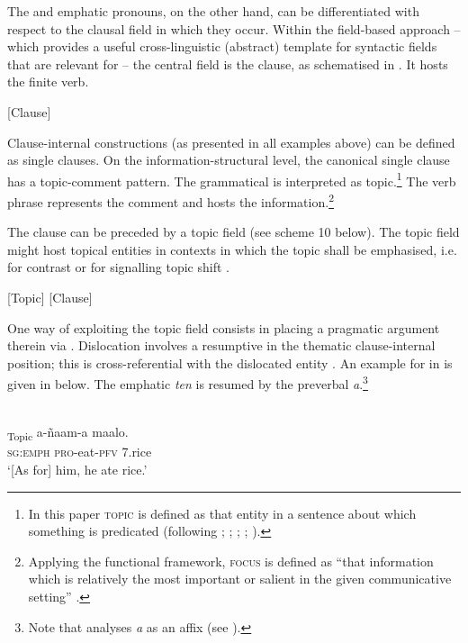 \documentclass[output=paper,newtxmath,modfonts,nonflat,hidelinks]{langsci/langscibook}
\begin{document}
The  and emphatic pronouns, on the other hand, can be differentiated with respect to the clausal field in which they occur. Within the field-based approach -- which provides a useful cross-linguistic (abstract) template for syntactic fields that are relevant for  \citep[see][]{Good2010,Güldemanninprep,Apeletal15} -- the central field is the clause, as schematised in . It hosts the finite verb.

\ea\label{ex:apel:9} [Clause]
\z

Clause-internal constructions (as presented in all examples above) can be defined as single clauses. On the information-structural level, the canonical single clause has a topic-comment pattern. The grammatical  is interpreted as topic.\footnote{In this paper \textsc{topic} is defined as that entity in a sentence about which something is predicated (following \citealt{Strawson1964}; \citealt{Hornby1971}; \citealt{Dik1997}; \citealt{Reinhart1982}; \citealt{Lambrecht1994}).} The verb phrase represents the comment and hosts the  information.\footnote{Applying the functional framework, \textsc{focus} is defined as “that information which is relatively the most important or salient in the given communicative setting” \citep[326]{Dik1997}.}

The clause can be preceded by a topic field (see scheme 10 below). The topic field might host topical entities in contexts in which the topic shall be emphasised, i.e. for contrast or for signalling topic shift \citep[see][153]{Givon76}.

\ea\label{ex:apel:10}
[Topic] [Clause]
\z

One way of exploiting the topic field consists in placing a pragmatic argument therein via . Dislocation involves a resumptive  in the thematic clause-internal position; this  is cross-referential with the dislocated entity \citep{GregoryMichaelis01,Lambrecht2001}. An example for  in  is given in  below. The emphatic  \textit{ten} is resumed by the preverbal  \textit{a}.\footnote{Note that \citet{Renaudier2012} analyses \textit{a} as an affix (see ).} 

\ea\label{ex:apel:11}{  \citep[53]{Renaudier2012}} \\
\gll   [Ten]\textsubscript{Topic} a-ñaam-a maalo.\\
     \textsc{sg:emph} \textsc{pro-}eat\textsc{-pfv} \textsc{7.}rice \\
\glt ‘[As for] him, he ate rice.’
\z
\end{document}
